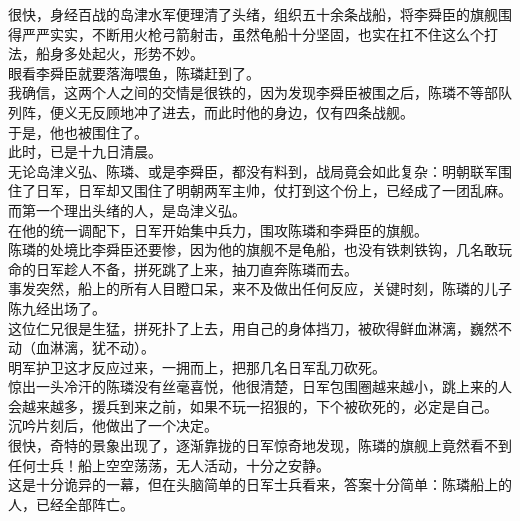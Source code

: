 \begin{multicols}{\theparacolNo}
很快，身经百战的岛津水军便理清了头绪，组织五十余条战船，将李舜臣的旗舰围得严严实实，不断用火枪弓箭射击，虽然龟船十分坚固，也实在扛不住这么个打法，船身多处起火，形势不妙。\\

眼看李舜臣就要落海喂鱼，陈璘赶到了。\\

我确信，这两个人之间的交情是很铁的，因为发现李舜臣被围之后，陈璘不等部队列阵，便义无反顾地冲了进去，而此时他的身边，仅有四条战舰。\\

于是，他也被围住了。\\

此时，已是十九日清晨。\\

无论岛津义弘、陈璘、或是李舜臣，都没有料到，战局竟会如此复杂：明朝联军围住了日军，日军却又围住了明朝两军主帅，仗打到这个份上，已经成了一团乱麻。\\

而第一个理出头绪的人，是岛津义弘。\\

在他的统一调配下，日军开始集中兵力，围攻陈璘和李舜臣的旗舰。\\

陈璘的处境比李舜臣还要惨，因为他的旗舰不是龟船，也没有铁刺铁钩，几名敢玩命的日军趁人不备，拼死跳了上来，抽刀直奔陈璘而去。\\

事发突然，船上的所有人目瞪口呆，来不及做出任何反应，关键时刻，陈璘的儿子陈九经出场了。\\

这位仁兄很是生猛，拼死扑了上去，用自己的身体挡刀，被砍得鲜血淋漓，巍然不动（血淋漓，犹不动）。\\

明军护卫这才反应过来，一拥而上，把那几名日军乱刀砍死。\\

惊出一头冷汗的陈璘没有丝毫喜悦，他很清楚，日军包围圈越来越小，跳上来的人会越来越多，援兵到来之前，如果不玩一招狠的，下个被砍死的，必定是自己。\\

沉吟片刻后，他做出了一个决定。\\

很快，奇特的景象出现了，逐渐靠拢的日军惊奇地发现，陈璘的旗舰上竟然看不到任何士兵！船上空空荡荡，无人活动，十分之安静。\\

这是十分诡异的一幕，但在头脑简单的日军士兵看来，答案十分简单：陈璘船上的人，已经全部阵亡。\\


\end{multicols}
